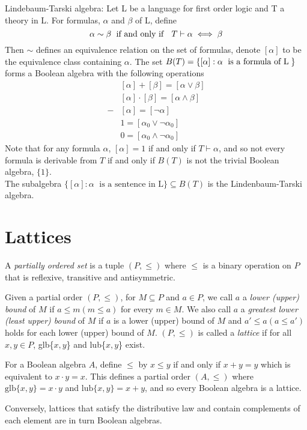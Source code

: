 \documentclass[12pt]{article}
\begin{document}
\begin{example}
Lindebaum-Tarski algebra: Let L be a language for first order logic and T a theory in L. For formulas, $\alpha$ and $\beta$ of L, define
$$
\alpha \sim \beta \text{\;  if and only if \; } T\vdash \alpha \iff \beta
$$
Then $\sim$ defines an equivalence relation on the set of formulas, denote $[\alpha]$ to be the equivalence class containing $\alpha$.
The set $B(T)=\{[\alpha]: \alpha \text{\; is a formula of L\;}\}$ forms a Boolean algebra with the following operations
\begin{align*}
&[\alpha]+[\beta]=[\alpha\vee\beta]\\
&[\alpha]\cdot[\beta]=[\alpha\wedge\beta]\\
-&[\alpha]=[\neg\alpha]\\
&1=[\alpha_0\vee\neg\alpha_0]\\
&0=[\alpha_0\wedge\neg\alpha_0]
\end{align*}
Note that for any formula $\alpha$, $[\alpha]=1$ if and only if $T\vdash \alpha$, and so not every formula is derivable from $T$ if and only if $B(T)$ is not the trivial Boolean algebra, $\{1\}$.
\\
The subalgebra $\{[\alpha]:\alpha\;\text{ is a sentence in L}\}\subseteq B(T)$ is the Lindenbaum-Tarski algebra.
\end{example}

\section{Lattices}

\begin{definition}
A \textit{partially ordered set} is a tuple $(P,\le)$ where $\le$ is a binary operation on $P$ that is reflexive, transitive and antisymmetric.
\end{definition}

\begin{definition}
Given a partial order $(P,\le)$, for $M\subseteq P$ and $a\in P$, we call $a$ a \textit{lower (upper) bound} of $M$ if $a\le m (m\le a)$ for every $m\in M$. We also call $a$ a \textit{greatest lower (least upper) bound} of $M$ if $a$ is a lower (upper) bound of $M$ and $a'\le a (a\le a')$ holds for each lower (upper) bound of $M$. $(P,\le)$ is called a \textit{lattice} if for all $x,y\in P$, glb\{$x,y$\} and lub\{$x,y$\} exist.
\end{definition}

\begin{lemma}
For a Boolean algebra $A$, define $\le$ by $x\le y$ if and only if $x+y=y$ which is equivalent to $x\cdot y=x$. This defines a partial order $(A,\le)$ where $\text{glb}\{x,y\}=x\cdot y$ and $\text{lub}\{x,y\}=x+y$, and so every Boolean algebra is a lattice.
\end{lemma}
Conversely, lattices that satisfy the distributive law and contain complements of each element are in turn Boolean algebras.
\end{document}
